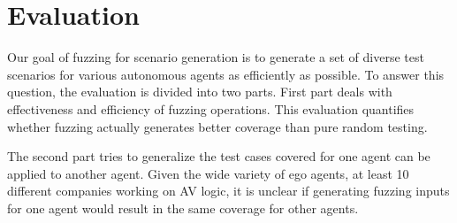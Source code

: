 \section{Evaluation}

Our goal of fuzzing for scenario generation is to generate a set of diverse test scenarios for various autonomous agents as efficiently as possible.
% 
To answer this question, the evaluation is divided into two parts.
% 
First part deals with effectiveness and efficiency of fuzzing operations.
% 
This evaluation quantifies whether fuzzing actually generates better coverage than pure random testing.
% 

The second part tries to generalize the test cases covered for one agent can be applied to another agent.
% 
Given the wide variety of ego agents, at least 10 different companies working on AV logic, it is unclear if generating fuzzing inputs for one agent would result in the same coverage for other agents.



